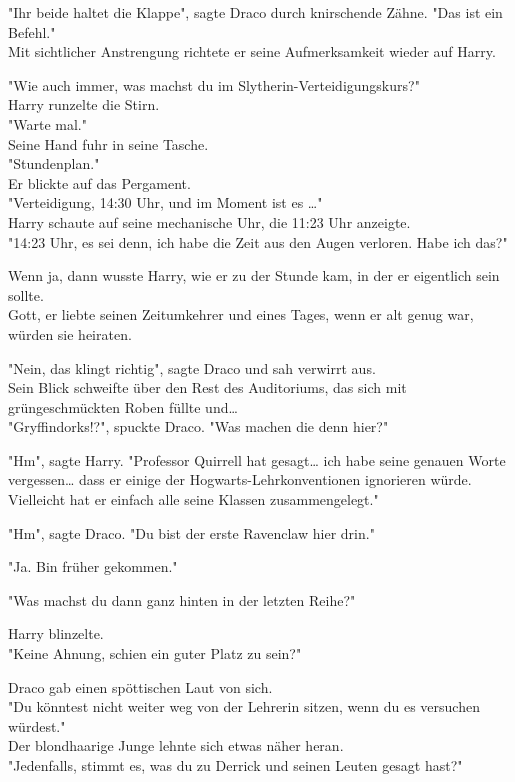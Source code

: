{"Ihr beide haltet die Klappe", sagte Draco durch knirschende Zähne. "Das ist ein Befehl."\\ Mit sichtlicher Anstrengung richtete er seine Aufmerksamkeit wieder auf Harry.

"Wie auch immer, was machst du im Slytherin-Verteidigungskurs?"\\ Harry runzelte die Stirn.\\ "Warte mal."\\ Seine Hand fuhr in seine Tasche.\\ "Stundenplan."\\ Er blickte auf das Pergament.\\ "Verteidigung, 14:30 Uhr, und im Moment ist es …"\\ Harry schaute auf seine mechanische Uhr, die 11:23 Uhr anzeigte.\\ "14:23 Uhr, es sei denn, ich habe die Zeit aus den Augen verloren. Habe ich das?"

Wenn ja, dann wusste Harry, wie er zu der Stunde kam, in der er eigentlich sein sollte.\\ Gott, er liebte seinen Zeitumkehrer und eines Tages, wenn er alt genug war, würden sie heiraten.

"Nein, das klingt richtig", sagte Draco und sah verwirrt aus.\\ Sein Blick schweifte über den Rest des Auditoriums, das sich mit grüngeschmückten Roben füllte und…\\ "Gryffindorks!?", spuckte Draco. "Was machen die denn hier?"

"Hm", sagte Harry. "Professor Quirrell hat gesagt… ich habe seine genauen Worte vergessen… dass er einige der Hogwarts-Lehrkonventionen ignorieren würde. Vielleicht hat er einfach alle seine Klassen zusammengelegt."

"Hm", sagte Draco. "Du bist der erste Ravenclaw hier drin."

"Ja. Bin früher gekommen."

"Was machst du dann ganz hinten in der letzten Reihe?"

Harry blinzelte.\\ "Keine Ahnung, schien ein guter Platz zu sein?"

Draco gab einen spöttischen Laut von sich.\\ "Du könntest nicht weiter weg von der Lehrerin sitzen, wenn du es versuchen würdest."\\ Der blondhaarige Junge lehnte sich etwas näher heran.\\ "Jedenfalls, stimmt es, was du zu Derrick und seinen Leuten gesagt hast?"

}
